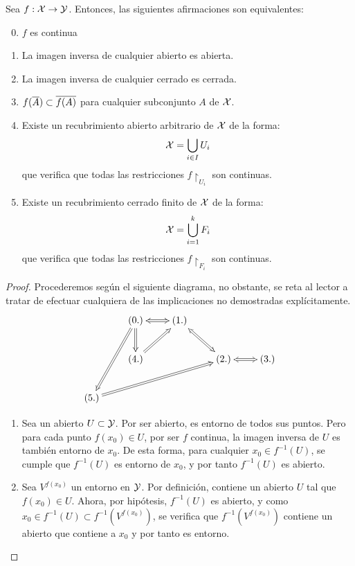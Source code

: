 \begin{prop}
	Sea $f:\mathcal{X}\to\mathcal{Y}$. Entonces, las siguientes afirmaciones son equivalentes:
	
	\begin{enumerate}
		\setcounter{enumi}{-1}
		\item $f$ es continua
		\item La imagen inversa de cualquier abierto es abierta.
		\item La imagen inversa de cualquier cerrado es cerrada.
		\item $f(\overline{A})\subset\overline{f(A)}$ para cualquier subconjunto $A$ de $\mathcal{X}$.
		\item Existe un recubrimiento abierto arbitrario de $\mathcal{X}$ de la forma:
			\[\mathcal{X}=\bigcup\limits_{i\in I} U_i\]
			que verifica que todas las restricciones $f\restriction_{U_i}$ son continuas.
		\item Existe un recubrimiento cerrado finito de $\mathcal{X}$ de la forma:
			\[\mathcal{X}=\bigcup\limits_{i=1}^k F_i\]
			que verifica que todas las restricciones $f\restriction_{F_i}$ son continuas.
	\end{enumerate}

	\begin{proof}
		Procederemos según el siguiente diagrama, no obstante, se reta al lector a tratar de efectuar cualquiera de las implicaciones no demostradas explícitamente.
		\[
		\xymatrix{&(0.)\ar@2{<->}[r]\ar@{=>}[d]&(1.)\ar@2{<->}[dr]& &\\
			&(4.)\ar@{=>}[ur] & &(2.)\ar@2{<->}[r]&(3.)\\
			(5.)\ar@{<=}[uur] \ar@{=>}[urrr]& & & &}
		\]
		\begin{enumerate}[align=left, leftmargin=*]
			\item[\fbox{$(0)\implies (1)$}] Sea un abierto $U\subset\mathcal{Y}$. Por ser abierto, es entorno de todos sus puntos. Pero para cada punto $f(x_0)\in U$, por ser $f$ continua, la imagen inversa de $U$ es también entorno de $x_0$. De esta forma, para cualquier $x_0\in f^{-1}(U)$, se cumple que $f^{-1}(U)$ es entorno de $x_0$, y por tanto $f^{-1}(U)$ es abierto.
			
			\item[\fbox{$(1)\implies (0)$}] Sea $V^{f(x_0)}$ un entorno en $\mathcal{Y}$. Por definición, contiene un abierto $U$ tal que $f(x_0)\in U$. Ahora, por hipótesis, $f^{-1}(U)$ es abierto, y como $x_0\in f^{-1}(U)\subset f^{-1}(V^{f(x_0)})$, se verifica que $f^{-1}(V^{f(x_0)})$ contiene un abierto que contiene a $x_0$ y por tanto es entorno.
			

\end{enumerate}
\end{proof}
\end{prop}

